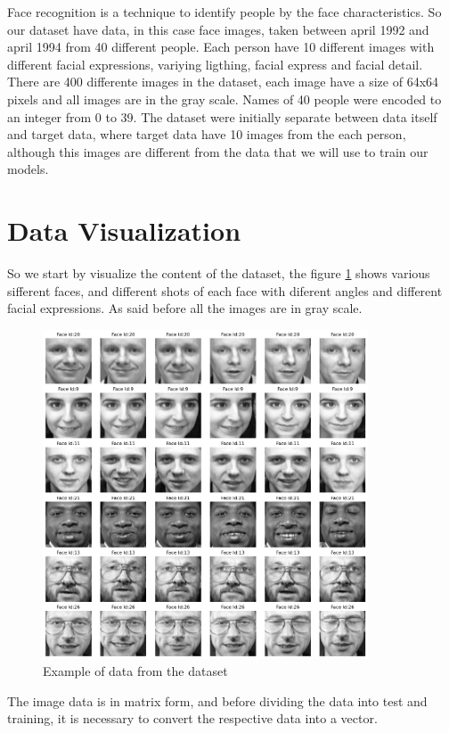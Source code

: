 \documentclass[conference]{IEEEtran}
\begin{document}
    Face recognition is a technique to identify people by the face characteristics. So our dataset \cite{dataset} have data, in this case face images, taken between april 1992 and april 1994 from 40 different people. Each person have 10 different images with different facial expressions, variying ligthing, facial express and facial detail. There are 400 differente images in the dataset, each image have a size of 64x64 pixels and all images are in the gray scale. Names of 40 people were encoded to an integer from 0 to 39. The dataset  were initially separate between data itself and target data, where target data have 10 images from the each person, although this images are different from the data that we will use to train our models.

    

\section{Data Visualization}

So we start by visualize the content of the dataset, the figure \ref{fig:example_of_data} shows various sifferent faces, and different shots of each face with diferent angles and different facial expressions. As said before all the images are in gray scale.

\begin{figure}[H]
    \centering
    \includegraphics[width=3.8in]{visualization/example_data.png}
    \caption{Example of data from the dataset}
    \label{fig:example_of_data}
\end{figure}

The image data is in matrix form, and before dividing the data into test and training, it is necessary to convert the respective data into a vector.
\end{document}
